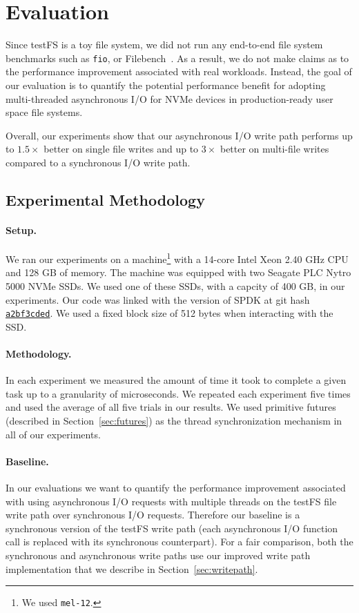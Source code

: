 \section{Evaluation}
Since testFS is a toy file system, we did not run any end-to-end file system
benchmarks such as {\tt fio}, or Filebench~\cite{filebench-tarasov16}. As a
result, we do not make claims as to the performance improvement associated with
real workloads. Instead, the goal of our evaluation is to quantify the
potential performance benefit for adopting multi-threaded asynchronous I/O for
NVMe devices in production-ready user space file systems.

Overall, our experiments show that our asynchronous I/O write path performs up
to $1.5\times$ better on single file writes and up to $3\times$ better on
multi-file writes compared to a synchronous I/O write path.

\subsection{Experimental Methodology}
\paragraph{Setup.}
We ran our experiments on a machine\footnote{We used {\tt mel-12}.} with a
14-core Intel Xeon 2.40 GHz CPU and 128 GB of memory. The machine was equipped
with two Seagate PLC Nytro 5000 NVMe SSDs. We used one of these SSDs, with a
capcity of 400 GB, in our experiments. Our code was linked with the version of
SPDK at git hash
\href{https://github.com/spdk/spdk/commit/a2bf3cded37b7cc7e402eae80da90891f921b56d}{\tt a2bf3cded}.
We used a fixed block size of 512 bytes when interacting with the SSD.

\paragraph{Methodology.}
In each experiment we measured the amount of time it took to complete a given
task up to a granularity of microseconds. We repeated each experiment five
times and used the average of all five trials in our results. We used primitive
futures (described in Section~\ref{sec:futures}) as the thread synchronization
mechanism in all of our experiments.

\paragraph{Baseline.}
In our evaluations we want to quantify the performance improvement associated
with using asynchronous I/O requests with multiple threads on the testFS file
write path over synchronous I/O requests. Therefore our baseline is a
synchronous version of the testFS write path (each asynchronous I/O function
call is replaced with its synchronous counterpart). For a fair comparison, both
the synchronous and asynchronous write paths use our improved write path
implementation that we describe in Section~\ref{sec:writepath}.

